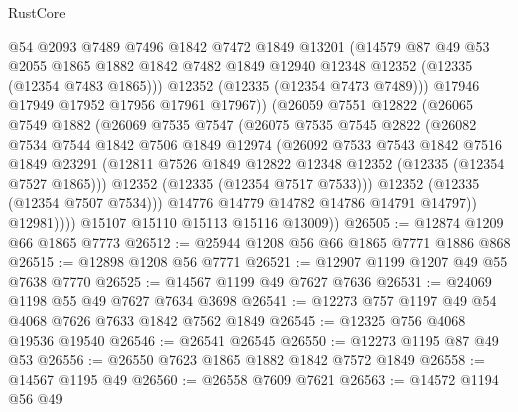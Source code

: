 \begin{lexlean}{RustCore}
\begin{coremodule}
                  @54
                  @2093
                  @7489
                  @7496
                  @1842
                  @7472
                  @1849
                  @13201
                  (@14579
                    @87
                    @49
                    @53
                    @2055
                    @1865
                    @1882
                    @1842
                    @7482
                    @1849
                    @12940
                    @12348
                    @12352
                    (@12335 (@12354 @7483 @1865)))
                  @12352
                  (@12335 (@12354 @7473 @7489)))
                @17946
                @17949
                @17952
                @17956
                @17961
                @17967))
            (@26059
              @7551
              @12822
              (@26065
                @7549
                @1882
                (@26069
                  @7535
                  @7547
                  (@26075
                    @7535
                    @7545
                    @2822
                    (@26082
                      @7534
                      @7544
                      @1842
                      @7506
                      @1849
                      @12974
                      (@26092
                        @7533
                        @7543
                        @1842
                        @7516
                        @1849
                        @23291
                        (@12811 @7526 @1849 @12822 @12348 @12352 (@12335 (@12354 @7527 @1865)))
                        @12352
                        (@12335 (@12354 @7517 @7533)))
                      @12352
                      (@12335 (@12354 @7507 @7534)))
                    @14776
                    @14779
                    @14782
                    @14786
                    @14791
                    @14797))
                @12981))))
        @15107
        @15110
        @15113
        @15116
        @13009))
@26505 := @12874 @1209 @66 @1865 @7773
@26512 := @25944 @1208 @56 @66 @1865 @7771 @1886 @868
@26515 := @12898 @1208 @56 @7771
@26521 := @12907 @1199 @1207 @49 @55 @7638 @7770
@26525 := @14567 @1199 @49 @7627 @7636
@26531 := @24069 @1198 @55 @49 @7627 @7634 @3698
@26541 := @12273 @757 @1197 @49 @54 @4068 @7626 @7633 @1842 @7562 @1849
@26545 := @12325 @756 @4068 @19536 @19540
@26546 := @26541 @26545
@26550 := @12273 @1195 @87 @49 @53
@26556 := @26550 @7623 @1865 @1882 @1842 @7572 @1849
@26558 := @14567 @1195 @49
@26560 := @26558 @7609 @7621
@26563 := @14572 @1194 @56 @49

\end{coremodule}
\end{lexlean}
